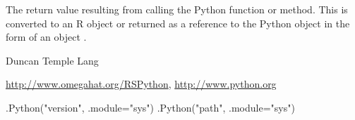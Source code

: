 \begin{Value}
The return value resulting from calling the Python function
or method. This is converted to an R object or 
returned as a reference  to the Python object
in the form of an object .\end{Value}
\begin{Author}\relax
Duncan Temple Lang\end{Author}
\begin{References}\relax
\url{http://www.omegahat.org/RSPython},
\url{http://www.python.org}\end{References}
\begin{SeeAlso}\relax
{}
\end{SeeAlso}
\begin{Examples}
\begin{ExampleCode}
 .Python("version", .module="sys")
 .Python("path", .module="sys")
\end{ExampleCode}
\end{Examples}

